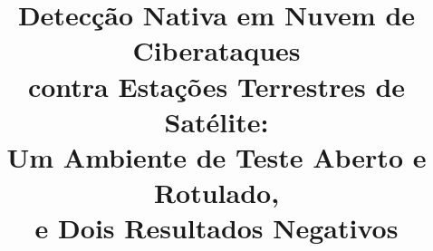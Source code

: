 \documentclass[conference]{IEEEtran}
\begin{document}
\title{Detecção Nativa em Nuvem de Ciberataques\\
contra Estações Terrestres de Satélite:\\
Um Ambiente de Teste Aberto e Rotulado,\\ e Dois Resultados Negativos}

\author{
}

\maketitle
\end{document}
